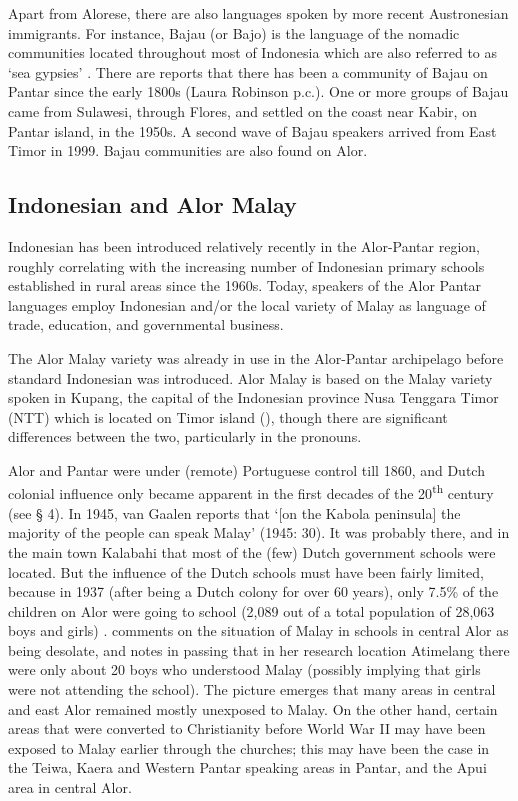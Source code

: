 Apart from Alorese, there are also languages spoken by more recent Austronesian immigrants. For instance, Bajau (or Bajo) is the language of the nomadic communities located throughout most of Indonesia which are also referred to as `sea gypsies' \citep[cf.][]{Verheijen1986}. There are reports that there has been a community of Bajau on Pantar since the early 1800s (Laura Robinson p.c.). One or more groups of Bajau came from Sulawesi, through Flores, and settled on the coast near Kabir, on Pantar island, in the 1950s. A second wave of Bajau speakers arrived from East Timor in 1999. Bajau communities are also found on Alor.

\subsection{Indonesian and Alor Malay}
Indonesian has been introduced relatively recently in the Alor-Pantar region, roughly correlating with the increasing number of Indonesian primary schools established in rural areas since the 1960s. Today, speakers of the Alor Pantar languages employ Indonesian and/or the local variety of Malay as language of trade, education, and governmental business.

The Alor Malay variety was already in use in the Alor-Pantar archipelago before standard Indonesian was introduced. Alor Malay is based on the Malay variety spoken in Kupang, the capital of the Indonesian province Nusa Tenggara Timor (NTT) which is located on Timor island (\citet{JacobEtAl2003,Baird,Klamer,Kratochvilms}), though there are significant differences between the two, particularly in the pronouns.

Alor and Pantar were under (remote) Portuguese control till 1860, and Dutch colonial influence only became apparent in the first decades of the 20\textsuperscript{th} century (see {\S} 4). In 1945, van Gaalen reports that `[on the Kabola peninsula] the majority of the people can speak Malay' (1945: 30). It was probably there, and in the main town Kalabahi that most of the (few) Dutch government schools were located. But the influence of the Dutch schools must have been fairly limited, because in 1937 (after being a Dutch colony for over 60 years), only 7.5\% of the children on Alor were going to school (2,089 out of a total population of 28,063 boys and girls) \citep[24,41a]{VanGaalen1945}. \citet[17]{DuBois1960} comments on the situation of Malay in schools in central Alor as being desolate, and notes in passing that in her research location Atimelang there were only about 20 boys who understood Malay (possibly implying that girls were not attending the school). The picture emerges that many areas in central and east Alor remained mostly unexposed to Malay. On the other hand, certain areas that were converted to Christianity before World War II may have been exposed to Malay earlier through the churches; this may have been the case in the Teiwa, Kaera and Western Pantar speaking areas in Pantar, and the Apui area in central Alor.

